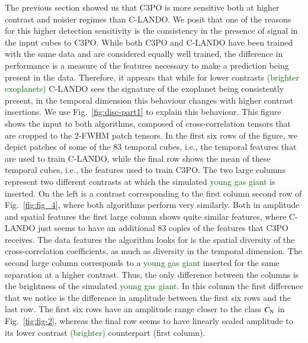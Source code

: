 \documentclass[referee]{aa} %
\newcommand{\newchange}[1]{\textcolor{darkgreen}{#1}}
\begin{document}
The previous section showed us that C3PO is more sensitive both at higher contrast and noisier regimes than C-LANDO.
We posit that one of the reasons for this higher detection sensitivity is the consistency in the presence of signal in the input cubes to C3PO.
While both C3PO and C-LANDO have been trained with the same data and are considered equally well trained, the difference in performance is a measure of the features necessary to make a prediction being present in the data.
Therefore, it appears that while for lower contrasts \newchange{(brighter exoplanets)} C-LANDO sees the signature of the exoplanet being consistently present, in the temporal dimension this behaviour changes with higher contrast insertions.
We use Fig.~\ref{fig:disc-part1} to explain this behaviour.
This figure shows the input to both algorithms, composed of cross-correlation tensors that are cropped to the 2-FWHM patch tensors.
In the first six rows of the figure, we depict patches of some of the $83$ temporal cubes, i.e., the temporal features that are used to train C-LANDO, while the final row shows the mean of these temporal cubes, i.e., the features used to train C3PO.
The two large columns represent two different contrasts at which the simulated \newchange{young gas giant} is inserted. On the left is a contrast corresponding to the first column second row of Fig.~\ref{fig:fig_4}, where both algorithms perform very similarly.
Both in amplitude and spatial features the first large column shows quite similar features, where C-LANDO just seems to have an additional $83$ copies of the features that C3PO receives. 
The data features the algorithm looks for is the spatial diversity of the cross-correlation coefficients, as much as diversity in the temporal dimension.
The second large column corresponds to a \newchange{young gas giant} inserted for the same separation at a higher contrast.
Thus, the only difference between the columns is the brightness of the simulated \newchange{young gas giant}.
In this column the first difference that we notice is the difference in amplitude between the first six rows and the last row.
The first six rows have an amplitude range closer to the class $C_{\rm N}$ in Fig.~\ref{fig:fig-2}, whereas the final row seems to have linearly scaled amplitude to its lower contrast \newchange{(brighter)} counterpart (first column).
\end{document}
